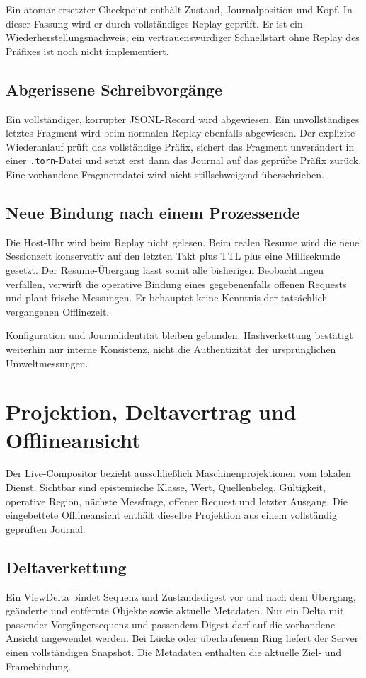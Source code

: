 \documentclass[11pt,a4paper]{article}
\newcommand{\nextsection}[2]{\clearpage{\color{accent}\small\textsf{#1}}\section{#2}}
\begin{document}
Ein atomar ersetzter Checkpoint enthält Zustand, Journalposition
und Kopf. In dieser Fassung wird er durch vollständiges Replay
geprüft. Er ist ein Wiederherstellungsnachweis; ein vertrauenswürdiger
Schnellstart ohne Replay des Präfixes ist noch nicht implementiert.

\subsection{Abgerissene Schreibvorgänge}
Ein vollständiger, korrupter JSONL-Record wird abgewiesen.
Ein unvollständiges letztes Fragment wird beim normalen Replay
ebenfalls abgewiesen. Der explizite Wiederanlauf prüft das
vollständige Präfix, sichert das Fragment unverändert in einer
\texttt{.torn}-Datei und setzt erst dann das Journal auf das
geprüfte Präfix zurück. Eine vorhandene Fragmentdatei wird
nicht stillschweigend überschrieben.

\subsection{Neue Bindung nach einem Prozessende}
Die Host-Uhr wird beim Replay nicht gelesen. Beim realen Resume
wird die neue Sessionzeit konservativ auf den letzten Takt plus
TTL plus eine Millisekunde gesetzt. Der Resume-Übergang lässt
somit alle bisherigen Beobachtungen verfallen, verwirft die
operative Bindung eines gegebenenfalls offenen Requests und
plant frische Messungen. Er behauptet keine Kenntnis der
tatsächlich vergangenen Offlinezeit.

Konfiguration und Journalidentität bleiben gebunden.
Hashverkettung bestätigt weiterhin nur interne Konsistenz,
nicht die Authentizität der ursprünglichen Umweltmessungen.

\nextsection{18 / LIVE SECOND LAYER}{Projektion, Deltavertrag und Offlineansicht}
Der Live-Compositor bezieht ausschließlich Maschinenprojektionen
vom lokalen Dienst. Sichtbar sind epistemische Klasse, Wert,
Quellenbeleg, Gültigkeit, operative Region, nächste Messfrage,
offener Request und letzter Ausgang. Die eingebettete Offlineansicht
enthält dieselbe Projektion aus einem vollständig geprüften Journal.

\subsection{Deltaverkettung}
Ein ViewDelta bindet Sequenz und Zustandsdigest vor und nach
dem Übergang, geänderte und entfernte Objekte sowie aktuelle
Metadaten. Nur ein Delta mit passender Vorgängersequenz und
passendem Digest darf auf die vorhandene Ansicht angewendet werden.
Bei Lücke oder überlaufenem Ring liefert der Server einen
vollständigen Snapshot. Die Metadaten enthalten die aktuelle
Ziel- und Framebindung.
\end{document}
